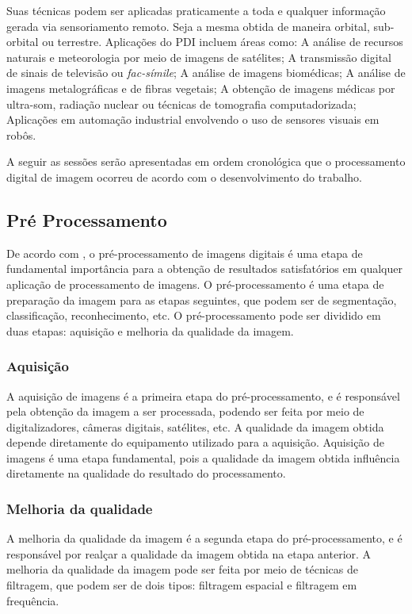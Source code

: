 \documentclass[conference]{IEEEtran}
\begin{document}
Suas técnicas podem ser aplicadas praticamente a toda e qualquer informação gerada via sensoriamento remoto. 
Seja a mesma obtida de maneira orbital, sub-orbital ou terrestre. Aplicações do PDI incluem áreas como: 
A análise de recursos naturais e meteorologia por meio de imagens de satélites; 
A transmissão digital de sinais de televisão ou \emph{fac-símile}; A análise de imagens biomédicas; 
A análise de imagens metalográficas e de fibras vegetais; 
A obtenção de imagens médicas por ultra-som, radiação nuclear ou técnicas de tomografia computadorizada; 
Aplicações em automação industrial envolvendo o uso de sensores visuais em robôs.

A seguir as sessões serão apresentadas em ordem cronológica que o processamento 
digital de imagem ocorreu de acordo com o desenvolvimento do trabalho.

\subsection{Pré Processamento}

De acordo com \cite{gonzalez2009}, o pré-processamento de imagens digitais é uma etapa de fundamental importância 
para a obtenção de resultados satisfatórios em qualquer aplicação de processamento de imagens. 
O pré-processamento é uma etapa de preparação da imagem para as etapas seguintes, que podem ser de segmentação, 
classificação, reconhecimento, etc. 
O pré-processamento pode ser dividido em duas etapas: aquisição e melhoria da qualidade da imagem.

\subsubsection{Aquisição}

A aquisição de imagens é a primeira etapa do pré-processamento, e é responsável pela obtenção da imagem a ser 
processada, podendo ser feita por meio de digitalizadores, câmeras digitais, satélites, etc. A qualidade da imagem 
obtida depende diretamente do equipamento utilizado para a aquisição. Aquisição de imagens é uma etapa fundamental, 
pois a qualidade da imagem obtida influência diretamente na qualidade do resultado do processamento.

\subsubsection{Melhoria da qualidade}
A melhoria da qualidade da imagem é a segunda etapa do pré-processamento, e é responsável por realçar a qualidade 
da imagem obtida na etapa anterior. A melhoria da qualidade da imagem pode ser feita por meio de técnicas de 
filtragem, que podem ser de dois tipos: filtragem espacial e filtragem em frequência.
\end{document}
